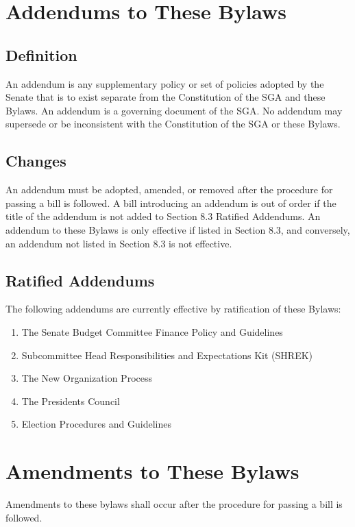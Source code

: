\documentclass[12pt]{scrreprt}
\begin{document}
\chapter{Addendums to These Bylaws} \label{sec:addendums}

\section{Definition}
An addendum is any supplementary policy or set of policies adopted by the Senate that is to exist separate from the Constitution of the SGA and these Bylaws. An addendum is a governing document of the SGA. No addendum may supersede or be inconsistent with the Constitution of the SGA or these Bylaws.

\section{Changes}
An addendum must be adopted, amended, or removed after the procedure for passing a bill is followed. A bill introducing an addendum is out of order if the title of the addendum is not added to Section 8.3 Ratified Addendums. An addendum to these Bylaws is only effective if listed in Section 8.3, and conversely, an addendum not listed in Section 8.3 is not effective.

\section{Ratified Addendums}
The following addendums are currently effective by ratification of these Bylaws:
\begin{enumerate}
    \item The Senate Budget Committee Finance Policy and Guidelines
    \item Subcommittee Head Responsibilities and Expectations Kit (SHREK)
    \item The New Organization Process 
    \item The Presidents Council
    \item Election Procedures and Guidelines
\end{enumerate}


\chapter{Amendments to These Bylaws} \label{sec:amendments}
Amendments to these bylaws shall occur after the procedure for passing a bill 
is followed. 
\end{document}
